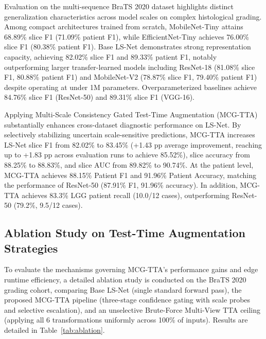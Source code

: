 Evaluation on the multi-sequence BraTS 2020 dataset highlights distinct generalization characteristics across model scales on complex histological grading. Among compact architectures trained from scratch, MobileNet-Tiny attains 68.89\% slice F1 (71.09\% patient F1), while EfficientNet-Tiny achieves 76.00\% slice F1 (80.38\% patient F1). Base LS-Net demonstrates strong representation capacity, achieving 82.02\% slice F1 and 89.33\% patient F1, notably outperforming larger transfer-learned models including ResNet-18 (81.08\% slice F1, 80.88\% patient F1) and MobileNet-V2 (78.87\% slice F1, 79.40\% patient F1) despite operating at under 1M parameters. Overparameterized baselines achieve 84.76\% slice F1 (ResNet-50) and 89.31\% slice F1 (VGG-16).

Applying Multi-Scale Consistency Gated Test-Time Augmentation (MCG-TTA) substantially enhances cross-dataset diagnostic performance on LS-Net. By selectively stabilizing uncertain scale-sensitive predictions, MCG-TTA increases LS-Net slice F1 from 82.02\% to 83.45\% (+1.43 pp average improvement, reaching up to +1.83 pp across evaluation runs to achieve 85.52\%), slice accuracy from 88.25\% to 88.83\%, and slice AUC from 89.82\% to 90.74\%. At the patient level, MCG-TTA achieves 88.15\% Patient F1 and 91.96\% Patient Accuracy, matching the performance of ResNet-50 (87.91\% F1, 91.96\% accuracy). In addition, MCG-TTA achieves 83.3\% LGG patient recall (10.0/12 cases), outperforming ResNet-50 (79.2\%, 9.5/12 cases).

\subsection{Ablation Study on Test-Time Augmentation Strategies}

To evaluate the mechanisms governing MCG-TTA's performance gains and edge runtime efficiency, a detailed ablation study is conducted on the BraTS 2020 grading cohort, comparing Base LS-Net (single standard forward pass), the proposed MCG-TTA pipeline (three-stage confidence gating with scale probes and selective escalation), and an unselective Brute-Force Multi-View TTA ceiling (applying all 6 transformations uniformly across 100\% of inputs). Results are detailed in Table~\ref{tab:ablation}.

